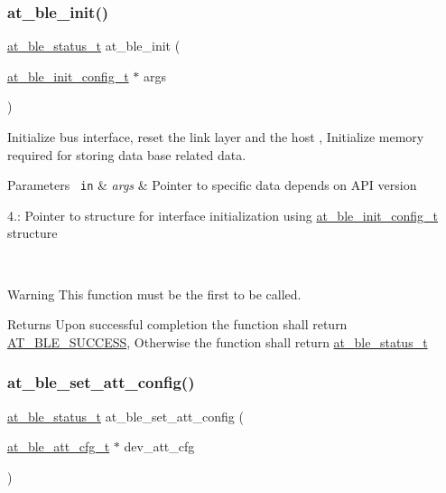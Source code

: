 \subsubsection{\texorpdfstring{at\_ble\_init()}{at\_ble\_init()}}
{\footnotesize\ttfamily \mbox{\hyperlink{group__error__codes__group_ga3b1db9b95feb157b3c188ca27fe76988}{at\+\_\+ble\+\_\+status\+\_\+t}} at\+\_\+ble\+\_\+init (\begin{DoxyParamCaption}\item[{\mbox{\hyperlink{structat__ble__init__config__t}{at\+\_\+ble\+\_\+init\+\_\+config\+\_\+t}} $\ast$}]{args }\end{DoxyParamCaption})}



Initialize bus interface, reset the link layer and the host , Initialize memory required for storing data base related data. 


\begin{DoxyParams}[1]{Parameters}
\mbox{\texttt{ in}}  & {\em args} & Pointer to specific data depends on A\+PI version
\begin{DoxyItemize}
\item 4.\+: Pointer to structure for interface initialization using \mbox{\hyperlink{structat__ble__init__config__t}{at\+\_\+ble\+\_\+init\+\_\+config\+\_\+t}} structure
\end{DoxyItemize}\\
\hline
\end{DoxyParams}
\begin{DoxyWarning}{Warning}
This function must be the first to be called.
\end{DoxyWarning}
\begin{DoxyReturn}{Returns}
Upon successful completion the function shall return \mbox{\hyperlink{group__error__codes__group_gga3b1db9b95feb157b3c188ca27fe76988a7e3bfff5387331cd4f2c56cbcbbd7e19}{A\+T\+\_\+\+B\+L\+E\+\_\+\+S\+U\+C\+C\+E\+SS}}, Otherwise the function shall return \mbox{\hyperlink{at__ble__api_8h_ace24eb4e5ca3f325c663b809da5feb92}{at\+\_\+ble\+\_\+status\+\_\+t}} 
\end{DoxyReturn}
\mbox{\label{group__gap__dev__config__group_ga53dde841286e2752674a9d51a20f20cf}} 
\subsubsection{\texorpdfstring{at\_ble\_set\_att\_config()}{at\_ble\_set\_att\_config()}}
{\footnotesize\ttfamily \mbox{\hyperlink{group__error__codes__group_ga3b1db9b95feb157b3c188ca27fe76988}{at\+\_\+ble\+\_\+status\+\_\+t}} at\+\_\+ble\+\_\+set\+\_\+att\+\_\+config (\begin{DoxyParamCaption}\item[{\mbox{\hyperlink{structat__ble__att__cfg__t}{at\+\_\+ble\+\_\+att\+\_\+cfg\+\_\+t}} $\ast$}]{dev\+\_\+att\+\_\+cfg }\end{DoxyParamCaption})}



